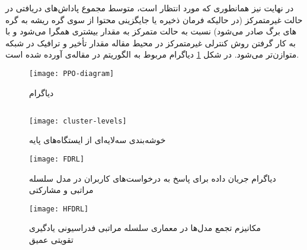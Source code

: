 در نهایت نیز همانطوری که مورد انتظار است، متوسط مجموع پاداش‌های دریافتی در حالت غیرمتمرکز (در حالیکه فرمان ذخیره یا جایگزینی محتوا از سوی گره ریشه به گره های برگ صادر می‌شود) نسبت به حالت متمرکز به مقدار بیشتری همگرا می‌شود و با به کار گرفتن روش کنترلی غیرمتمرکز در محیط مقاله مقدار تأخیر و ترافیک در شبکه متوازن‌تر می‌شود.
\pagebreak
در شکل \ref{fig:ppod} دیاگرام مربوط به الگوریتم  در مقاله‌ی \cite{wu2022deep} آورده شده است.

\begin{figure}[ht]
	\centerline{\texttt{[image: PPO-diagram]}}
	\caption{دیاگرام }
	\label{fig:ppod}
\end{figure}

\subsection{}


\begin{figure}[ht]
	\centerline{\texttt{[image: cluster-levels]}}
	\caption{خوشه‌بندی سه‌لایه‌ای از ایستگاه‌های پایه}
	\label{fig:cluster-levels}
\end{figure}

\begin{figure}[ht]
	\centerline{\texttt{[image: FDRL]}}
	\caption{دیاگرام جریان داده برای پاسخ به درخواست‌های کاربران در مدل سلسله مراتبی و مشارکتی}
	\label{fig:fdrl}
\end{figure}

\begin{figure}[ht]
	\centerline{\texttt{[image: HFDRL]}}
	\caption{مکانیزم تجمع مدل‌ها در معماری سلسله مراتبی فدراسیونی یادگیری تقویتی عمیق}
	\label{fig:hfdrl}
\end{figure}

